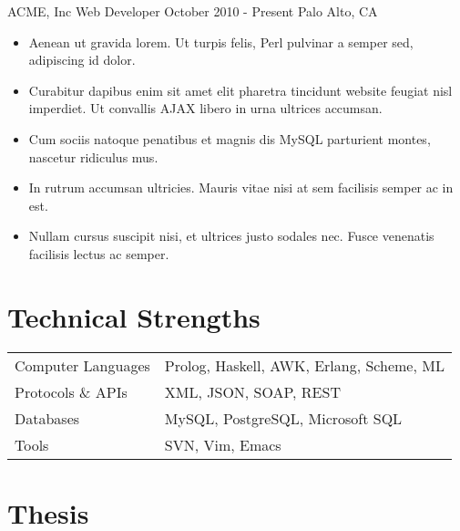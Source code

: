 \documentclass{article}
\begin{document}

{ACME, Inc}
{Web Developer}
October 2010 - Present
Palo Alto, CA

\begin{itemize}
\item Aenean ut gravida lorem. Ut turpis felis, Perl pulvinar a semper sed, adipiscing id dolor.
\item Curabitur dapibus enim sit amet elit pharetra tincidunt website feugiat nisl imperdiet. Ut convallis AJAX libero in urna ultrices accumsan.
\item Cum sociis natoque penatibus et magnis dis MySQL parturient montes, nascetur ridiculus mus.
\item In rutrum accumsan ultricies. Mauris vitae nisi at sem facilisis semper ac in est.
\item Nullam cursus suscipit nisi, et ultrices justo sodales nec. Fusce venenatis facilisis lectus ac semper.
\end{itemize}




\section{Technical Strengths}

\begin{tabular}{ll}
Computer Languages & Prolog, Haskell, AWK, Erlang, Scheme, ML \\
Protocols \& APIs & XML, JSON, SOAP, REST \\
Databases & MySQL, PostgreSQL, Microsoft SQL \\
Tools & SVN, Vim, Emacs
\end{tabular}


\section{Thesis}

\begin{refsection}

\nocite{las-96-thesis}

\printbibliography[heading=none]
\end{refsection}
\end{document}
